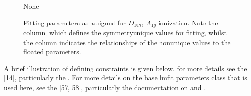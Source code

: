 \documentclass[letterpaper,table,10pt,english]{jupyterBook}
\begin{document}
\begin{figure}[htbp]
\centering
\capstart

\begin{sphinxVerbatim}[commandchars=\\\{\}]
None
\end{sphinxVerbatim}
\caption{Fitting parameters as assigned for \(D_{10h}\), \(A_{1g}\) ionization. Note the  column, which defines the symmetry\sphinxhyphen{}unique values for fitting, whilst the  column indicates the relationships of the non\sphinxhyphen{}unique values to the floated parameters.}\label{\detokenize{part2/sym-fitting-intro_220423:fig-fittingparamsd10ha1g}}\end{figure}

\sphinxAtStartPar
{}

\sphinxAtStartPar
A brief illustration of defining constraints is given below, for more details see the  {[}\hyperlink{cite.backmatter/bibliography:id667}{14}{]}, particularly the . For more details on the base lmfit parameters class that is used here, see the  {[}\hyperlink{cite.backmatter/bibliography:id741}{57}, \hyperlink{cite.backmatter/bibliography:id787}{58}{]}, particularly the documentation on  and .
\end{document}
